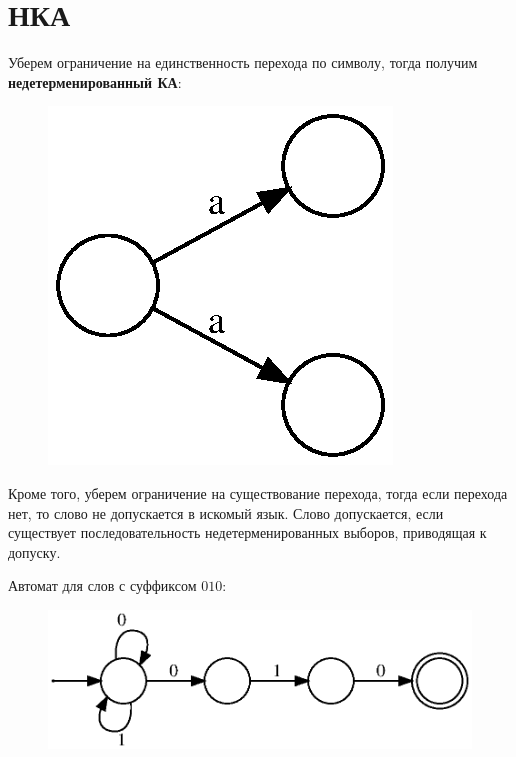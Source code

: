 

\cfoot{}



\section*{НКА}

Уберем ограничение на единственность перехода по символу, тогда получим \textbf{недетерменированный КА}:

\begin{figure}[h]
    \centering
    \includegraphics{graphs/8.1.dot.eps}
\end{figure}

Кроме того, уберем ограничение на существование перехода, тогда если перехода нет, то слово не допускается в искомый язык.
Слово допускается, если существует последовательность недетерменированных выборов, приводящая к допуску.

\begin{example}
    Автомат для слов с суффиксом $010$:
    \begin{figure}[h]
        \centering
        \includegraphics{graphs/8.2.dot.eps}
    \end{figure}
\end{example}

